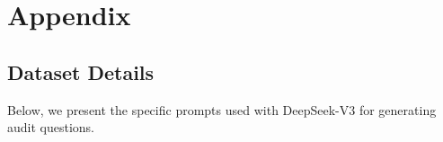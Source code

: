 \section{Appendix}
\label{sec:appendix}

\subsection{Dataset Details}
\label{sec:appendix_dataset}

Below, we present the specific prompts used with DeepSeek-V3 for generating audit questions.


